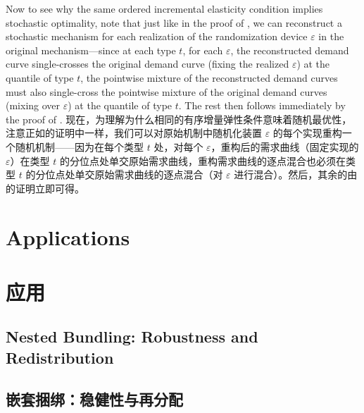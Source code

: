 \documentclass[12pt,letterpaper]{article}
\newenvironment{original}{\color{black}\noindent}{}
\newenvironment{translation}{\color{blue}\noindent}{}
\theoremstyle{plain}
\theoremstyle{definition}
\theoremstyle{remark}
\renewcommand{\1}{\mathds{1}}
\renewcommand{\epsilon}{\varepsilon}
\theoremstyle{definition}
\begin{document}
\begin{original}
Now to see why the same ordered incremental elasticity condition implies stochastic optimality, note that just like in the proof of , we can reconstruct a stochastic mechanism for each realization of the randomization device $\epsilon$ in the original mechanism---since at each type $t$, for each $\epsilon$,  the reconstructed demand curve single-crosses the original demand curve (fixing the realized $\epsilon$) at the quantile of type $t$, the pointwise mixture of the reconstructed demand curves must also single-cross the pointwise mixture of the original demand curves (mixing over $\epsilon$) at the quantile of type $t$. The rest then follows immediately by the proof of .
\end{original}
\begin{translation}
现在，为理解为什么相同的有序增量弹性条件意味着随机最优性，注意正如的证明中一样，我们可以对原始机制中随机化装置 $\epsilon$ 的每个实现重构一个随机机制——因为在每个类型 $t$ 处，对每个 $\epsilon$，重构后的需求曲线（固定实现的 $\epsilon$）在类型 $t$ 的分位点处单交原始需求曲线，重构需求曲线的逐点混合也必须在类型 $t$ 的分位点处单交原始需求曲线的逐点混合（对 $\epsilon$ 进行混合）。然后，其余的由的证明立即可得。
\end{translation}

\begin{original}
\section{Applications}\label{sec:application}
\end{original}
\begin{translation}
\section{应用}\label{sec:application}
\end{translation}

\begin{original}
\subsection{Nested Bundling: Robustness and Redistribution}
\end{original}
\begin{translation}
\subsection{嵌套捆绑：稳健性与再分配}
\end{translation}
\end{document}
